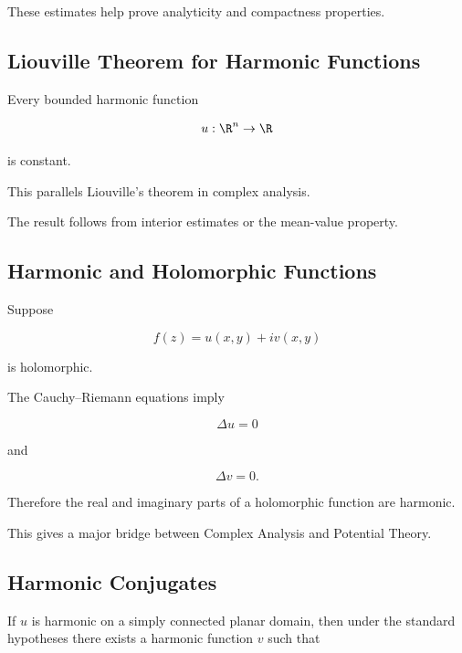 These estimates help prove analyticity and compactness properties.

\subsection{Liouville Theorem for Harmonic Functions}
\label{subsec:harmonic-liouville}

\begin{theorem}
Every bounded harmonic function

\[
u:\R^n\to\R
\]

is constant.
\end{theorem}

This parallels Liouville's theorem in complex analysis.

The result follows from interior estimates or the mean-value property.

\subsection{Harmonic and Holomorphic Functions}
\label{subsec:harmonic-holomorphic}

Suppose

\[
f(z)=u(x,y)+iv(x,y)
\]

is holomorphic.

The Cauchy--Riemann equations imply

\[
\boxed{
\Delta u=0
}
\]

and

\[
\boxed{
\Delta v=0.
}
\]

Therefore the real and imaginary parts of a holomorphic function are
harmonic.

This gives a major bridge between Complex Analysis and Potential Theory.

\subsection{Harmonic Conjugates}
\label{subsec:potential-harmonic-conjugates}

If \(u\) is harmonic on a simply connected planar domain, then under the
standard hypotheses there exists a harmonic function \(v\) such that

